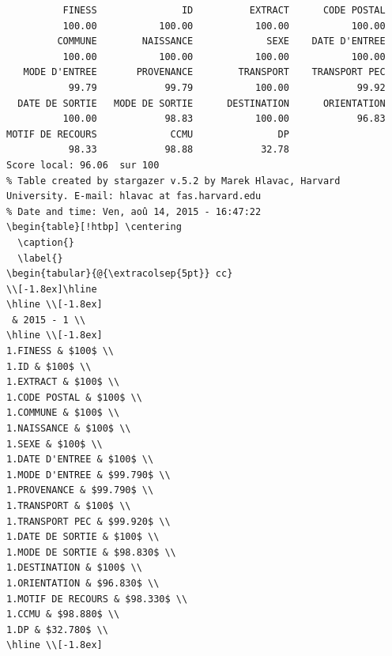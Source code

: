 \documentclass[]{article}
\begin{document}
\begin{verbatim}
          FINESS               ID          EXTRACT      CODE POSTAL 
          100.00           100.00           100.00           100.00 
         COMMUNE        NAISSANCE             SEXE    DATE D'ENTREE 
          100.00           100.00           100.00           100.00 
   MODE D'ENTREE       PROVENANCE        TRANSPORT    TRANSPORT PEC 
           99.79            99.79           100.00            99.92 
  DATE DE SORTIE   MODE DE SORTIE      DESTINATION      ORIENTATION 
          100.00            98.83           100.00            96.83 
MOTIF DE RECOURS             CCMU               DP 
           98.33            98.88            32.78 
Score local: 96.06  sur 100
% Table created by stargazer v.5.2 by Marek Hlavac, Harvard University. E-mail: hlavac at fas.harvard.edu
% Date and time: Ven, aoû 14, 2015 - 16:47:22
\begin{table}[!htbp] \centering 
  \caption{} 
  \label{} 
\begin{tabular}{@{\extracolsep{5pt}} cc} 
\\[-1.8ex]\hline 
\hline \\[-1.8ex] 
 & 2015 - 1 \\ 
\hline \\[-1.8ex] 
1.FINESS & $100$ \\ 
1.ID & $100$ \\ 
1.EXTRACT & $100$ \\ 
1.CODE POSTAL & $100$ \\ 
1.COMMUNE & $100$ \\ 
1.NAISSANCE & $100$ \\ 
1.SEXE & $100$ \\ 
1.DATE D'ENTREE & $100$ \\ 
1.MODE D'ENTREE & $99.790$ \\ 
1.PROVENANCE & $99.790$ \\ 
1.TRANSPORT & $100$ \\ 
1.TRANSPORT PEC & $99.920$ \\ 
1.DATE DE SORTIE & $100$ \\ 
1.MODE DE SORTIE & $98.830$ \\ 
1.DESTINATION & $100$ \\ 
1.ORIENTATION & $96.830$ \\ 
1.MOTIF DE RECOURS & $98.330$ \\ 
1.CCMU & $98.880$ \\ 
1.DP & $32.780$ \\ 
\hline \\[-1.8ex] 

\end{verbatim}
\end{document}
